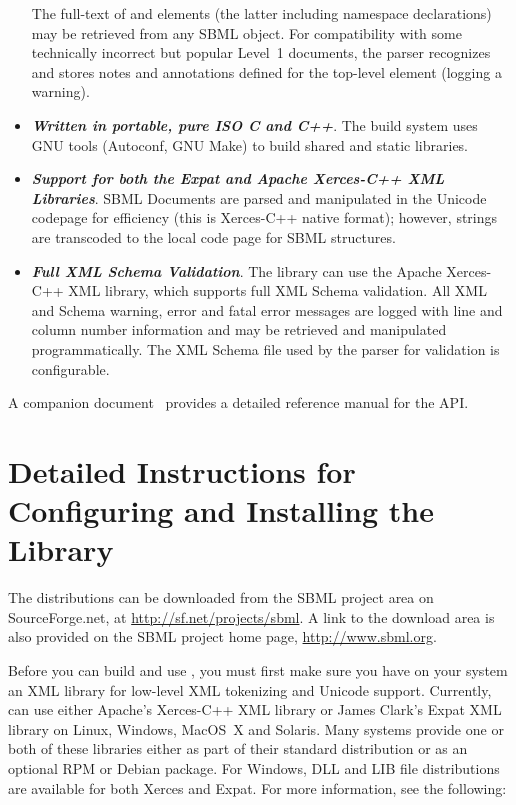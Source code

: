 \documentclass{sbmlmanual}
\begin{document}
\begin{itemize}
  The full-text of  and  elements (the
  latter including namespace declarations) may be retrieved from any
  SBML object.  For compatibility with some technically incorrect but
  popular Level~1 documents, the parser recognizes and stores notes
  and annotations defined for the top-level  element (logging
  a warning).
    
\item \textbf{\textsl{Written in portable, pure ISO C and C++}}. The build
  system uses GNU tools (Autoconf, GNU Make) to build shared and static
  libraries.
  
\item \textbf{\textsl{Support for both the Expat and Apache Xerces-C++ XML
      Libraries}}.  SBML Documents are parsed and manipulated in the
  Unicode codepage for efficiency (this is Xerces-C++ native format);
  however, strings are transcoded to the local code page for SBML
  structures.

\item \textbf{\textsl{Full XML Schema Validation}}. The library can use the
  Apache Xerces-C++ XML library, which supports full XML Schema validation.
  All XML and Schema warning, error and fatal error messages are logged
  with line and column number information and may be retrieved and
  manipulated programmatically.  The XML Schema file used by the parser for
  validation is configurable.

\end{itemize}

A companion document~\citep{bornstein_2004b} provides a detailed reference
manual for the API.



\section{Detailed Instructions for Configuring and Installing the Library}
\label{sec:installation}

The \libsbml{} distributions can be downloaded from the SBML project area
on SourceForge.net, at \url{http://sf.net/projects/sbml}.  A link to the
download area is also provided on the SBML project home page,
\url{http://www.sbml.org}.

Before you can build and use \libsbml{}, you must first make sure you have
on your system an XML library for low-level XML tokenizing and Unicode
support.  Currently, \libsbml{} can use either Apache's Xerces-C++ XML
library or James Clark's Expat XML library on Linux, Windows, MacOS~X and
Solaris.  Many systems provide one or both of these libraries either as
part of their standard distribution or as an optional RPM or Debian
package.  For Windows, DLL and LIB file distributions are available for
both Xerces and Expat.  For more information, see the following:
\end{document}
